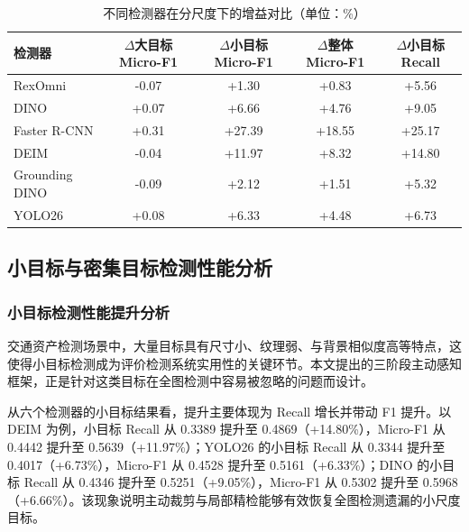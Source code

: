\begin{table}[htbp]
    \centering
    \caption{不同检测器在分尺度下的增益对比（单位：\%）}
    \label{tab:scale_results}
    \begin{tabular}{lcccc}
        \toprule
        检测器 & \shortstack{$\Delta$大目标\\Micro-F1} & \shortstack{$\Delta$小目标\\Micro-F1} & \shortstack{$\Delta$整体\\Micro-F1} & \shortstack{$\Delta$小目标\\Recall} \\
        \midrule
        RexOmni & -0.07 & +1.30 & +0.83 & +5.56 \\
        DINO & +0.07 & +6.66 & +4.76 & +9.05 \\
        Faster R-CNN & +0.31 & +27.39 & +18.55 & +25.17 \\
        DEIM & -0.04 & +11.97 & +8.32 & +14.80 \\
        Grounding DINO & -0.09 & +2.12 & +1.51 & +5.32 \\
        YOLO26 & +0.08 & +6.33 & +4.48 & +6.73 \\
        \bottomrule
    \end{tabular}
\end{table}

\subsection{小目标与密集目标检测性能分析}
\label{sec:small_dense_analysis}

\subsubsection{小目标检测性能提升分析}

交通资产检测场景中，大量目标具有尺寸小、纹理弱、与背景相似度高等特点，这使得小目标检测成为评价检测系统实用性的关键环节。本文提出的三阶段主动感知框架，正是针对这类目标在全图检测中容易被忽略的问题而设计。

从六个检测器的小目标结果看，提升主要体现为 Recall 增长并带动 F1 提升。以 DEIM 为例，小目标 Recall 从 0.3389 提升至 0.4869（+14.80\%），Micro-F1 从 0.4442 提升至 0.5639（+11.97\%）；YOLO26 的小目标 Recall 从 0.3344 提升至 0.4017（+6.73\%），Micro-F1 从 0.4528 提升至 0.5161（+6.33\%）；DINO 的小目标 Recall 从 0.4346 提升至 0.5251（+9.05\%），Micro-F1 从 0.5302 提升至 0.5968（+6.66\%）。该现象说明主动裁剪与局部精检能够有效恢复全图检测遗漏的小尺度目标。

